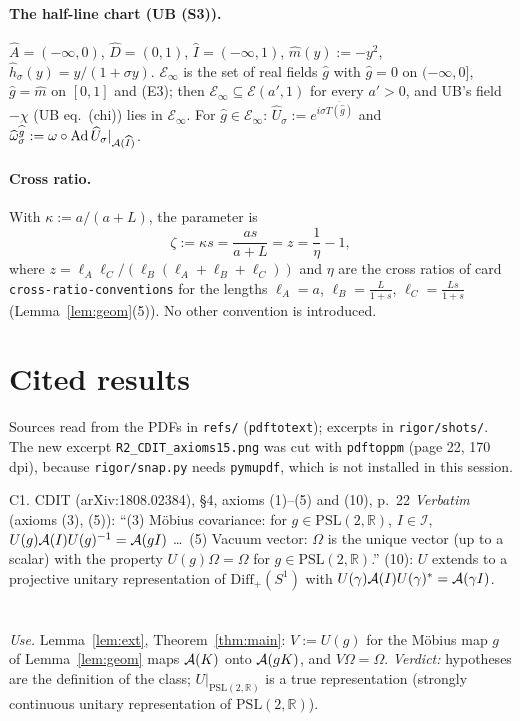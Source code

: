 \documentclass[11pt]{article}
\newcommand{\Om}{\Omega}
\newcommand{\Ad}{\operatorname{Ad}}
\newcommand{\Diff}{\mathrm{Diff}_+}
\newcommand{\PSL}{\mathrm{PSL}(2,\mathbb R)}
\begin{document}
\paragraph{The half-line chart (UB (S3)).}  $\widehat A=(-\infty,0)$, $\widehat D=(0,1)$,
$\widehat I=(-\infty,1)$, $\widehat m(y):=-y^2$, $\widehat h_\sigma(y)=y/(1+\sigma y)$.  $\mathcal E_\infty$ is the set of
real fields $\widehat g$ with $\widehat g=0$ on $(-\infty,0]$, $\widehat g=\widehat m$ on $[0,1]$ and (E3); then
$\mathcal E_\infty\subseteq\mathcal E(a',1)$ for every $a'>0$, and UB's field $-\chi$ (UB eq.~(chi)) lies in
$\mathcal E_\infty$.  For $\widehat g\in\mathcal E_\infty$: $\widehat U_\sigma:=e^{i\sigma\overline{T(\widehat g)}}$ and
$\widehat\omega_\sigma^{\widehat g}:=\omega\circ\Ad\widehat U_\sigma|_{\cA(\widehat I)}$.

\paragraph{Cross ratio.}  With $\kappa:=a/(a+L)$, the parameter is
\begin{equation}\label{eq:zeta}
 \zeta:=\kappa s=\frac{as}{a+L}=z=\frac1\eta-1,
\end{equation}
where $z=\ell_A\ell_C/(\ell_B(\ell_A+\ell_B+\ell_C))$ and $\eta$ are the cross ratios of card
\texttt{cross-ratio-conventions} for the lengths $\ell_A=a$, $\ell_B=\frac L{1+s}$, $\ell_C=\frac{Ls}{1+s}$
(Lemma~\ref{lem:geom}(5)).  No other convention is introduced.

\section{Cited results}\label{sec:cited}
Sources read from the PDFs in \texttt{refs/} (\texttt{pdftotext}); excerpts in \texttt{rigor/shots/}.
The new excerpt \texttt{R2\_CDIT\_axioms15.png} was cut with \texttt{pdftoppm} (page 22, 170 dpi), because
\texttt{rigor/snap.py} needs \texttt{pymupdf}, which is not installed in this session.

\begin{citedbox}{C1. CDIT (arXiv:1808.02384), \S4, axioms (1)--(5) and (10), p.~22}
\emph{Verbatim} (axioms (3), (5)): ``(3) Möbius covariance: for $g\in\PSL$, $I\in\mathcal I$,
$U(g)\mathcal A(I)U(g)^{-1}=\mathcal A(gI)$ \dots\ (5) Vacuum vector: $\Om$ is the unique vector (up to a scalar) with the property
$U(g)\Om=\Om$ for $g\in\PSL$.''  (10): $U$ extends to a projective unitary representation of $\Diff(S^1)$ with
$U(\gamma)\mathcal A(I)U(\gamma)^*=\mathcal A(\gamma I)$.\\[2pt]
\\[2pt]
\\[2pt]
\emph{Use.} Lemma~\ref{lem:ext}, Theorem~\ref{thm:main}: $V:=U(g)$ for the Möbius map $g$ of
Lemma~\ref{lem:geom} maps $\mathcal A(K)$ onto $\mathcal A(gK)$, and $V\Om=\Om$.  \emph{Verdict:} hypotheses are the definition of
the class; $U|_{\PSL}$ is a true representation (strongly continuous unitary representation of $\PSL$).
\end{citedbox}
\end{document}
